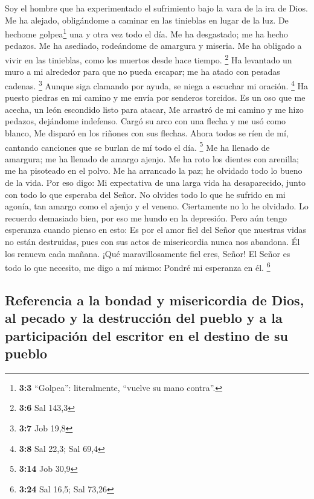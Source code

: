  Soy el hombre que ha experimentado el sufrimiento bajo la
vara de la ira de Dios.  Me ha alejado, obligándome a
caminar en las tinieblas en lugar de la luz.  De hechome
golpea\footnote{\textbf{3:3} ``Golpea'': literalmente, ``vuelve su mano
  contra''.} una y otra vez todo el día.  Me ha
desgastado; me ha hecho pedazos.  Me ha asediado,
rodeándome de amargura y miseria.  Me ha obligado a vivir
en las tinieblas, como los muertos desde hace tiempo. \footnote{\textbf{3:6}
  Sal 143,3}  Ha levantado un muro a mi alrededor para que
no pueda escapar; me ha atado con pesadas cadenas. \footnote{\textbf{3:7}
  Job 19,8}  Aunque siga clamando por ayuda, se niega a
escuchar mi oración. \footnote{\textbf{3:8} Sal 22,3; Sal 69,4}
 Ha puesto piedras en mi camino y me envía por senderos
torcidos.  Es un oso que me acecha, un león escondido
listo para atacar,  Me arrastró de mi camino y me hizo
pedazos, dejándome indefenso.  Cargó su arco con una
flecha y me usó como blanco,  Me disparó en los riñones
con sus flechas.  Ahora todos se ríen de mí, cantando
canciones que se burlan de mí todo el día. \footnote{\textbf{3:14} Job
  30,9}  Me ha llenado de amargura; me ha llenado de
amargo ajenjo.  Me ha roto los dientes con arenilla; me
ha pisoteado en el polvo.  Me ha arrancado la paz; he
olvidado todo lo bueno de la vida.  Por eso digo: Mi
expectativa de una larga vida ha desaparecido, junto con todo lo que
esperaba del Señor.  No olvides todo lo que he sufrido en
mi agonía, tan amargo como el ajenjo y el veneno. 
Ciertamente no lo he olvidado. Lo recuerdo demasiado bien, por eso me
hundo en la depresión.  Pero aún tengo esperanza cuando
pienso en esto:  Es por el amor fiel del Señor que
nuestras vidas no están destruidas, pues con sus actos de misericordia
nunca nos abandona.  Él los renueva cada mañana. ¡Qué
maravillosamente fiel eres, Señor!  El Señor es todo lo
que necesito, me digo a mí mismo: Pondré mi esperanza en él. \footnote{\textbf{3:24}
  Sal 16,5; Sal 73,26}

\hypertarget{referencia-a-la-bondad-y-misericordia-de-dios-al-pecado-y-la-destrucciuxf3n-del-pueblo-y-a-la-participaciuxf3n-del-escritor-en-el-destino-de-su-pueblo}{%
\subsection{Referencia a la bondad y misericordia de Dios, al pecado y
la destrucción del pueblo y a la participación del escritor en el
destino de su
pueblo}\label{referencia-a-la-bondad-y-misericordia-de-dios-al-pecado-y-la-destrucciuxf3n-del-pueblo-y-a-la-participaciuxf3n-del-escritor-en-el-destino-de-su-pueblo}}

